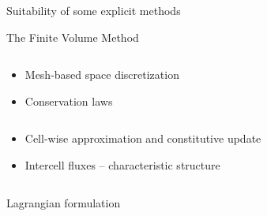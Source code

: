 \begin{frame}{Suitability of some explicit methods}
\begin{block}{The Finite Volume Method \cite{Leveque}}
\begin{overprint}
\begin{columns}
\begin{footnotesize}
\begin{column}{0.4\textwidth}
\begin{itemize}
            \item[] Mesh-based space discretization
            \item[] Conservation laws
            \end{itemize}
          \end{column}
          \begin{column}{0.6\textwidth}
            \begin{itemize}
            \item[] Cell-wise approximation and constitutive update
            \item[] Intercell fluxes -- characteristic structure \cite{Godunov_method}
            \end{itemize}
          \end{column}
        \end{footnotesize}
      \end{columns}
      \vskip -10pt
      \begin{columns}
        \begin{column}{0.48\textwidth}
          \begin{block}{\footnotesize Lagrangian formulation \cite{Haider_FVM}} %
            \centering
          \end{block}
        \end{column}
        \begin{column}{0.48\textwidth}
              

\end{column}
\end{columns}
\end{overprint}
\end{block}
\end{frame}

